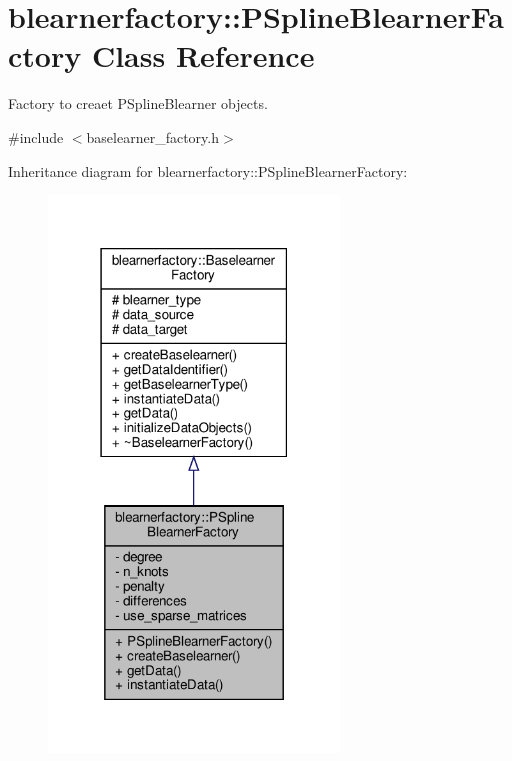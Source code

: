 \hypertarget{classblearnerfactory_1_1_p_spline_blearner_factory}{}\section{blearnerfactory\+:\+:P\+Spline\+Blearner\+Factory Class Reference}
\label{classblearnerfactory_1_1_p_spline_blearner_factory}


Factory to creaet {\ttfamily P\+Spline\+Blearner} objects.  




{\ttfamily \#include $<$baselearner\+\_\+factory.\+h$>$}



Inheritance diagram for blearnerfactory\+:\+:P\+Spline\+Blearner\+Factory\+:\nopagebreak
\begin{figure}[H]
\begin{center}
\leavevmode
\includegraphics[width=219pt]{classblearnerfactory_1_1_p_spline_blearner_factory__inherit__graph}
\end{center}
\end{figure}


